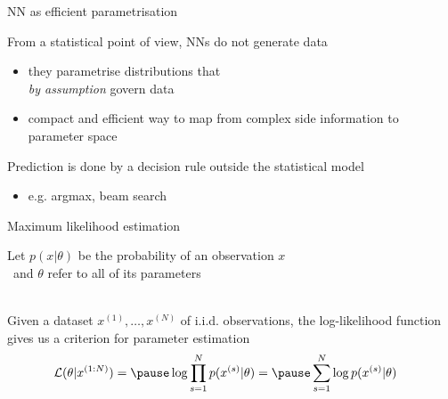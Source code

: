 \documentclass[14pt]{beamer}
\begin{document}
\begin{frame}{NN as efficient parametrisation}

From a statistical point of view, NNs do not generate data\\
\begin{itemize}
	\item \alert{they parametrise distributions} that \\
	\emph{by assumption} govern data
	\item compact and efficient way to \alert{map from complex side information to parameter space}
\end{itemize}

\vspace{10pt}

\pause
Prediction is done by a decision rule outside the statistical model
\begin{itemize}
	\item e.g. argmax, beam search
\end{itemize}

\end{frame}



\begin{frame}{Maximum likelihood estimation}

Let $p(x|\theta)$ be the probability of an observation $x$\\
~and $\theta$ refer to all of its parameters \\

~ \pause

Given a dataset $x^{(1)}, \ldots, x^{(N)}$ of i.i.d. observations, \pause
the log-likelihood function gives us a criterion for parameter estimation
\begin{equation*}
\begin{aligned}
\mathcal L(\theta|x^{(1:N)}) &= \pause \log \prod_{s=1}^N p(x^{(s)}|\theta) 
 = \pause \sum_{s=1}^N \log p(x^{(s)}|\theta)
\end{aligned}
\end{equation*} 


\end{frame}
\end{document}
